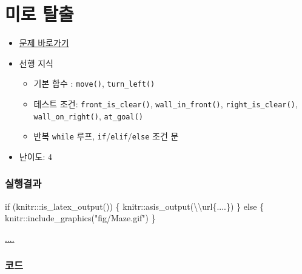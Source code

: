 \documentclass[
  b5paperpaper,
  DIV=11,
  numbers=noendperiod]{scrreprt}
\newenvironment{Shaded}{\begin{snugshade}}{\end{snugshade}}
\newcommand{\ControlFlowTok}[1]{\textcolor[rgb]{0.00,0.23,0.31}{#1}}
\newcommand{\FunctionTok}[1]{\textcolor[rgb]{0.28,0.35,0.67}{#1}}
\newcommand{\NormalTok}[1]{\textcolor[rgb]{0.00,0.23,0.31}{#1}}
\newcommand{\SpecialCharTok}[1]{\textcolor[rgb]{0.37,0.37,0.37}{#1}}
\newcommand{\StringTok}[1]{\textcolor[rgb]{0.13,0.47,0.30}{#1}}
\providecommand{\tightlist}{%
  \setlength{\itemsep}{0pt}\setlength{\parskip}{0pt}}\usepackage{longtable,booktabs,array}
\begin{document}
\hypertarget{maze}{%
\chapter{미로 탈출}\label{maze}}

\begin{itemize}
\tightlist
\item
  \href{https://reeborg.ca/reeborg.html?lang=ko-en\&mode=python\&menu=worlds\%2Fmenus\%2Freeborg_intro_en.json\&name=Maze\&url=worlds\%2Ftutorial_en\%2Fmaze1.json}{문제
  바로가기}
\item
  선행 지식

  \begin{itemize}
  \tightlist
  \item
    기본 함수 : \texttt{move()}, \texttt{turn\_left()}
  \item
    테스트 조건: \texttt{front\_is\_clear()},
    \texttt{wall\_in\_front()}, \texttt{right\_is\_clear()},
    \texttt{wall\_on\_right()}, \texttt{at\_goal()}
  \item
    반복 \texttt{while} 루프, \texttt{if}/\texttt{elif}/\texttt{else}
    조건 문
  \end{itemize}
\item
  난이도: 4
\end{itemize}

\hypertarget{uxc2e4uxd589uxacb0uxacfc-23}{%
\subsection{실행결과}\label{uxc2e4uxd589uxacb0uxacfc-23}}

\begin{Shaded}
\begin{Highlighting}[]
\ControlFlowTok{if}\NormalTok{ (knitr}\SpecialCharTok{:::}\FunctionTok{is\_latex\_output}\NormalTok{()) \{}
\NormalTok{  knitr}\SpecialCharTok{::}\FunctionTok{asis\_output}\NormalTok{(}\StringTok{\textquotesingle{}}\SpecialCharTok{\textbackslash{}\textbackslash{}}\StringTok{url\{....\}\textquotesingle{}}\NormalTok{)}
\NormalTok{\} }\ControlFlowTok{else}\NormalTok{ \{}
\NormalTok{  knitr}\SpecialCharTok{::}\FunctionTok{include\_graphics}\NormalTok{(}\StringTok{"fig/Maze.gif"}\NormalTok{)}
\NormalTok{\}}
\end{Highlighting}
\end{Shaded}

\url{....}

\hypertarget{uxcf54uxb4dc-23}{%
\subsection{코드}\label{uxcf54uxb4dc-23}}
\end{document}
